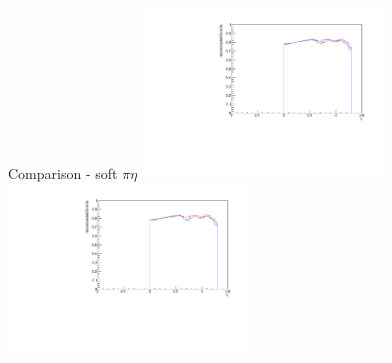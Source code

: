 \documentclass[11pt]{beamer}
\begin{document}
\begin{frame}{Comparison - soft $\pi \eta$}
\centering
\includegraphics[width=0.48\textwidth]{sec/up_pdf/combined/h_eta_reco_SPi.pdf}
\includegraphics[width=0.48\textwidth]{sec/down_pdf/combined/h_eta_reco_SPi.pdf}
\end{frame}
\end{document}
